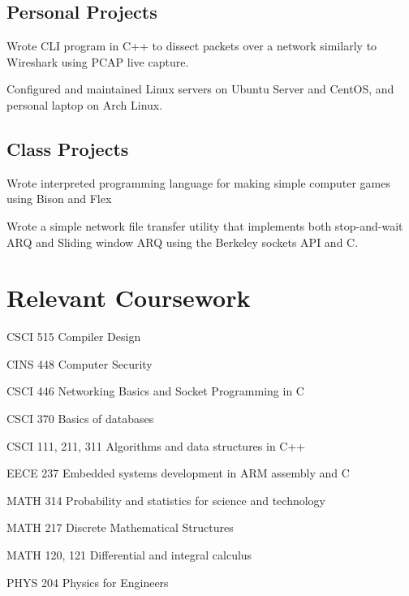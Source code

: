 \documentclass[letterpaper]{article}
\renewenvironment{itemize}{
  \begin{list}{}{
    \setlength{\leftmargin}{1.5em}
  }
}{
  \end{list}
}
\begin{document}
\subsection*{Personal Projects}
\begin{itemize}
    \item Wrote CLI program in C++ to dissect packets over a network similarly to Wireshark using PCAP live capture.
    \item Configured and maintained Linux servers on Ubuntu Server and CentOS, and personal laptop on Arch Linux.
\end{itemize}
\subsection*{Class Projects}
\begin{itemize}
    \item Wrote interpreted programming language for making simple computer games using Bison and Flex
    \item Wrote a simple network file transfer utility that implements both stop-and-wait ARQ and Sliding window ARQ using the Berkeley sockets API and C.
\end{itemize}
\begin{minipage}[t]{0.475\linewidth}
    \section*{Relevant Coursework}
    \begin{itemize}
        \item CSCI 515 Compiler Design
        \item CINS 448 Computer Security
        \item CSCI 446 Networking Basics and Socket Programming in C
        \item CSCI 370 Basics of databases
        \item CSCI 111, 211, 311 Algorithms and data structures in C++
        \item EECE 237 Embedded systems development in ARM assembly and C
        \item MATH 314 Probability and statistics for science and technology
        \item MATH 217 Discrete Mathematical Structures
        \item MATH 120, 121 Differential and integral calculus
        \item PHYS 204 Physics for Engineers
    \end{itemize}
\end{minipage}
\end{document}
